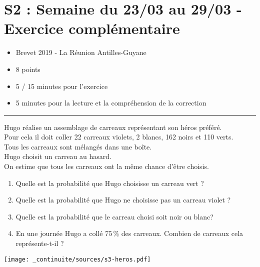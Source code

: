 \documentclass[12pt]{article}
\newcommand{\horrule}[1]{\rule{\linewidth}{#1}} %
\begin{document}

\newtheorem{Definition}{Définition}
\newtheorem{Theorem}{Théorème}
\newtheorem{Proposition}{Propriété}

\renewcommand{\labelitemi}{$\bullet$}
\renewcommand{\labelitemii}{$\circ$}

\setlength{\columnseprule}{1pt}

\section*{S2 : Semaine du 23/03 au 29/03 - Exercice complémentaire}

\begin{itemize}
  \item Brevet 2019 - La Réunion Antilles-Guyane
  \item 8 points
  \item 5 / 15 minutes pour l'exercice
  \item 5 minutes pour la lecture et la compréhension de la correction
\end{itemize}

 \horrule{2px}

\parbox{0.8\linewidth}{
    Hugo réalise un assemblage de carreaux représentant son héros préféré. \\
    Pour cela il doit coller 22 carreaux violets, 2 blancs, 162 noirs et 110 verts.\\
    Tous les carreaux sont mélangés dans une boîte.\\
    Hugo choisit un carreau au hasard.\\
    On estime que tous les carreaux ont la même chance d'être choisis.\\

    \medskip
    \begin{enumerate}
    \item Quelle est la probabilité que Hugo choisisse un carreau vert ?
    \item Quelle est la probabilité que Hugo ne choisisse pas un carreau violet ?
    \item Quelle est la probabilité que le carreau choisi soit noir ou blanc?
    \item En une journée Hugo a collé 75\,\% des carreaux. Combien de carreaux cela représente-t-il ?
    \end{enumerate}
    }
\hfill \parbox{0.18\linewidth}{
    \texttt{[image: \_continuite/sources/s3-heros.pdf]}
    }
\end{document}
